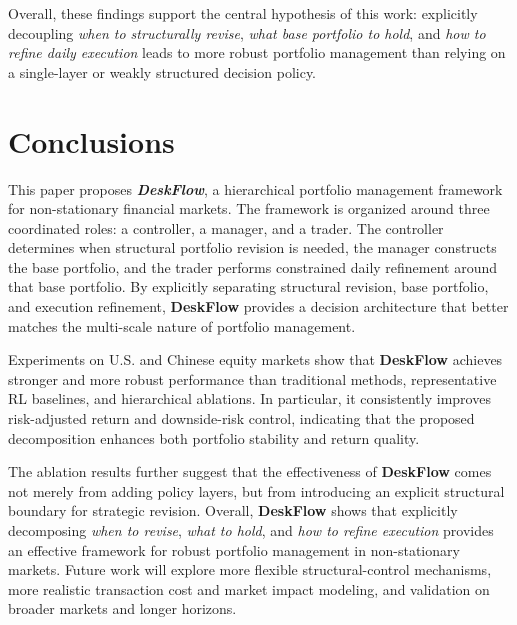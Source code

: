 \documentclass[letterpaper]{article} %
\begin{document}
Overall, these findings support the central hypothesis of this work: explicitly decoupling \emph{when to structurally revise}, \emph{what base portfolio to hold}, and \emph{how to refine daily execution} leads to more robust portfolio management than relying on a single-layer or weakly structured decision policy.


\section{Conclusions}

This paper proposes \textit{\textbf{DeskFlow}}, a hierarchical portfolio management framework for non-stationary financial markets. The framework is organized around three coordinated roles: a controller, a manager, and a trader. The controller determines when structural portfolio revision is needed, the manager constructs the base portfolio, and the trader performs constrained daily refinement around that base portfolio. By explicitly separating structural revision, base portfolio, and execution refinement, \textbf{DeskFlow} provides a decision architecture that better matches the multi-scale nature of portfolio management.

Experiments on U.S. and Chinese equity markets show that \textbf{DeskFlow} achieves stronger and more robust performance than traditional methods, representative RL baselines, and hierarchical ablations. In particular, it consistently improves risk-adjusted return and downside-risk control, indicating that the proposed decomposition enhances both portfolio stability and return quality.

The ablation results further suggest that the effectiveness of \textbf{DeskFlow} comes not merely from adding policy layers, but from introducing an explicit structural boundary for strategic revision. Overall, \textbf{DeskFlow} shows that explicitly decomposing \emph{when to revise}, \emph{what to hold}, and \emph{how to refine execution} provides an effective framework for robust portfolio management in non-stationary markets. Future work will explore more flexible structural-control mechanisms, more realistic transaction cost and market impact modeling, and validation on broader markets and longer horizons.



% 
\end{document}
